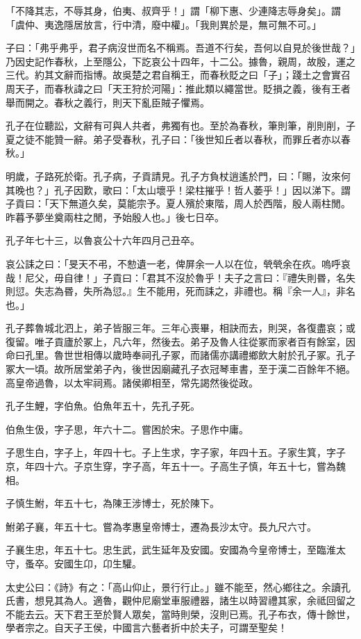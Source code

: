 \begin{pinyinscope}
「不降其志，不辱其身，伯夷、叔齊乎！」謂「柳下惠、少連降志辱身矣」。謂「虞仲、夷逸隱居放言，行中清，廢中權」。「我則異於是，無可無不可。」

子曰：「弗乎弗乎，君子病沒世而名不稱焉。吾道不行矣，吾何以自見於後世哉？」乃因史記作春秋，上至隱公，下訖哀公十四年，十二公。據魯，親周，故殷，運之三代。約其文辭而指博。故吳楚之君自稱王，而春秋貶之曰「子」；踐土之會實召周天子，而春秋諱之曰「天王狩於河陽」：推此類以繩當世。貶損之義，後有王者舉而開之。春秋之義行，則天下亂臣賊子懼焉。

孔子在位聽訟，文辭有可與人共者，弗獨有也。至於為春秋，筆則筆，削則削，子夏之徒不能贊一辭。弟子受春秋，孔子曰：「後世知丘者以春秋，而罪丘者亦以春秋。」

明歲，子路死於衛。孔子病，子貢請見。孔子方負杖逍遙於門，曰：「賜，汝來何其晚也？」孔子因歎，歌曰：「太山壞乎！梁柱摧乎！哲人萎乎！」因以涕下。謂子貢曰：「天下無道久矣，莫能宗予。夏人殯於東階，周人於西階，殷人兩柱閒。昨暮予夢坐奠兩柱之閒，予始殷人也。」後七日卒。

孔子年七十三，以魯哀公十六年四月己丑卒。

哀公誄之曰：「旻天不弔，不愸遺一老，俾屏余一人以在位，煢煢余在疚。嗚呼哀哉！尼父，毋自律！」子貢曰：「君其不沒於魯乎！夫子之言曰：『禮失則昬，名失則愆。失志為昬，失所為愆。』生不能用，死而誄之，非禮也。稱『余一人』，非名也。」

孔子葬魯城北泗上，弟子皆服三年。三年心喪畢，相訣而去，則哭，各復盡哀；或復留。唯子貢廬於冢上，凡六年，然後去。弟子及魯人往從冢而家者百有餘室，因命曰孔里。魯世世相傳以歲時奉祠孔子冢，而諸儒亦講禮鄉飲大射於孔子冢。孔子冢大一頃。故所居堂弟子內，後世因廟藏孔子衣冠琴車書，至于漢二百餘年不絕。高皇帝過魯，以太牢祠焉。諸侯卿相至，常先謁然後從政。

孔子生鯉，字伯魚。伯魚年五十，先孔子死。

伯魚生伋，字子思，年六十二。嘗困於宋。子思作中庸。

子思生白，字子上，年四十七。子上生求，字子家，年四十五。子家生箕，字子京，年四十六。子京生穿，字子高，年五十一。子高生子慎，年五十七，嘗為魏相。

子慎生鮒，年五十七，為陳王涉博士，死於陳下。

鮒弟子襄，年五十七。嘗為孝惠皇帝博士，遷為長沙太守。長九尺六寸。

子襄生忠，年五十七。忠生武，武生延年及安國。安國為今皇帝博士，至臨淮太守，蚤卒。安國生卬，卬生驩。

太史公曰：《詩》有之：「高山仰止，景行行止。」雖不能至，然心鄉往之。余讀孔氏書，想見其為人。適魯，觀仲尼廟堂車服禮器，諸生以時習禮其家，余祗回留之不能去云。天下君王至於賢人眾矣，當時則榮，沒則已焉。孔子布衣，傳十餘世，學者宗之。自天子王侯，中國言六藝者折中於夫子，可謂至聖矣！


\end{pinyinscope}